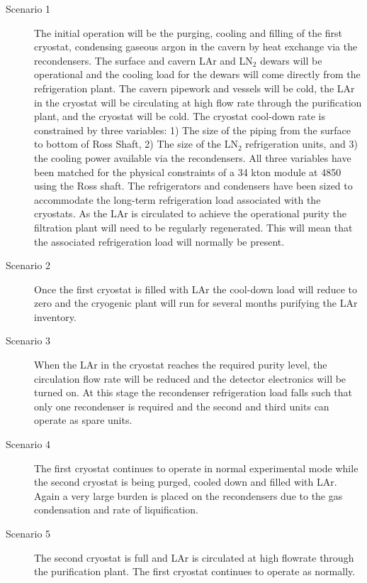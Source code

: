 \begin{description}
\item[Scenario 1]
The initial operation will be the purging, cooling and filling of the first cryostat, condensing gaseous argon in the cavern by heat exchange via the recondensers.
The surface and cavern LAr and  LN$_2$ dewars will be operational and the cooling load for the
dewars will come directly from the refrigeration plant. The cavern pipework and vessels will
be cold, the LAr in the cryostat will be circulating at high flow rate through the
purification plant, and the cryostat will be cold.  The cryostat cool-down rate is constrained by three variables: 1) The size of the piping from the surface to bottom of Ross Shaft, 2) The size of the LN$_2$ refrigeration units, and 3) the cooling power available via the recondensers.  All three variables have been matched for the physical constraints of a 34 kton module at 4850 using the Ross shaft. The refrigerators and condensers have been sized to accommodate the long-term refrigeration load associated with the cryostats.  As the LAr is circulated to achieve the operational purity the filtration plant will need to be regularly regenerated. This will mean that the associated refrigeration load will normally be present.


\item[Scenario 2]
Once the first cryostat is filled with LAr the cool-down load will reduce to zero and the cryogenic plant will run for several months purifying the LAr inventory.

\item[Scenario 3]
When the LAr in the cryostat reaches the required purity level, the circulation flow rate will be reduced and the detector electronics will be turned on.  At this stage the recondenser refrigeration load falls such that only one recondenser is required and the second and third units can operate as spare units.

\item[Scenario 4] The first cryostat continues to operate in normal experimental mode %
while  the second cryostat is being purged, cooled down and filled with LAr. Again a very large burden is placed on the recondensers due to the gas condensation and rate of liquification.

\item[Scenario 5] The second cryostat is full and LAr is circulated at high flowrate through the purification plant.  The first cryostat continues to operate as normally.


\end{description}
